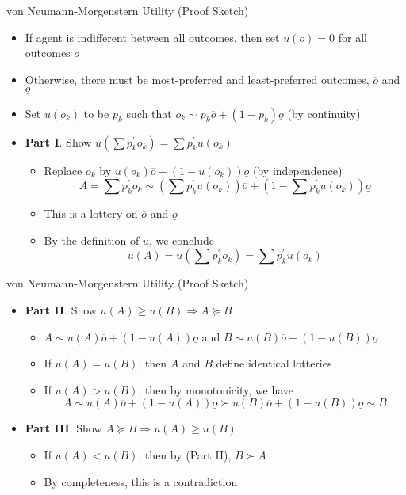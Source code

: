 \documentclass[11pt,aspectratio=169,handout]{beamer}
\begin{document}
  \begin{frame}{von Neumann-Morgenstern Utility (Proof Sketch)}
   \begin{itemize}[<+->]
    \item If agent is indifferent between all outcomes, then set $u(o) = 0$ for all outcomes $o$
    \item Otherwise, there must be most-preferred and least-preferred outcomes, $\overline{o}$ and $\underline{o}$
    \item Set $u(o_k)$ to be $p_k$ such that $o_k \sim p_k\overline{o}+(1-p_k)\underline{o}$ (by \alert{continuity})
    \item \textbf{Part I}.
    Show $u\left(\sum p^\prime_k o_k\right) = \sum p^\prime_k u(o_k)$
    \begin{itemize}[<.(1)->]
     \item Replace $o_k$ by $u(o_k)\overline{o}+(1-u(o_k))\underline{o}$ (by \alert{independence})
      \[A = \sum p^\prime_k o_k \sim \left(\sum p^\prime_k u(o_k)\right) \overline{o} + \left(1-\sum p^\prime_k u(o_k)\right)\underline{o}\]
     \item This is a lottery on $\overline{o}$ and $\underline{o}$
     \item By the definition of $u$, we conclude
       \[u(A) = u\left(\sum p^\prime_k o_k\right) = \sum p^\prime_k u(o_k)\]
    \end{itemize}
   \end{itemize}
  \end{frame}
  
  \begin{frame}{von Neumann-Morgenstern Utility (Proof Sketch)}
   \begin{itemize}[<+->]
    \item \textbf{Part II}.
    Show $u(A) \ge u(B) \Longrightarrow A \succeq B$
    \begin{itemize}[<.(1)->]
     \item $A \sim u(A)\overline{o} + (1-u(A))\underline{o}$ and $B \sim u(B)\overline{o} + (1-u(B))\underline{o}$
     \item If $u(A) = u(B)$, then $A$ and $B$ define identical lotteries
     \item If $u(A) > u(B)$, then by \alert{monotonicity}, we have
     \[A \sim u(A)\overline{o} + (1-u(A))\underline{o} \succ u(B)\overline{o} + (1-u(B))\underline{o} \sim B\]
    \end{itemize}
    \item \textbf{Part III}.
    Show $A \succeq B \Longrightarrow u(A) \ge u(B)$
    \begin{itemize}[<.(1)->]
     \item If $u(A) < u(B)$, then by (Part II), $B \succ A$
     \item By \alert{completeness}, this is a contradiction
    \end{itemize}
   \end{itemize}
  \end{frame}
  
\end{document}
